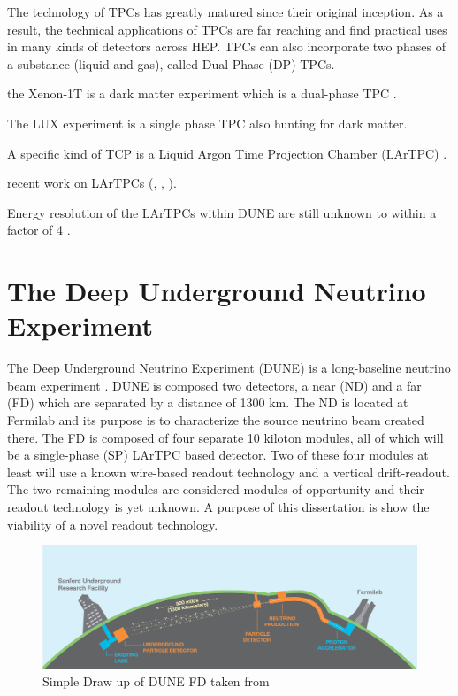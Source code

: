 The technology of TPCs has greatly matured since their original inception. 
As a result, the technical applications of TPCs are far reaching and find practical uses
in many kinds of detectors across HEP. TPCs can also incorporate two phases of a substance (liquid and gas), called Dual Phase (DP) TPCs.

the Xenon-1T is a dark matter experiment which is a dual-phase TPC \citep{Aprile_2017_xenon1T}.

The LUX experiment is a single phase TPC also hunting for dark matter.


A specific kind of TCP is a Liquid Argon Time Projection Chamber (LArTPC) \citep{rubbia1977liquid}.

recent work on LArTPCs (\citep{ArgoNeuT:PhysRevD.99.012002}, \citep{MicroBooNE:Acciarri_2017}, \citep{LArIAT:Acciarri_2020}).


Energy resolution of the LArTPCs within DUNE are still unknown to within a factor of 4 \citep{lartpc_energy_resolution:PhysRevD.99.036009}.


\section{The Deep Underground Neutrino Experiment}

The Deep Underground Neutrino Experiment (DUNE) is a long-baseline neutrino beam experiment \cite{DUNE_TDR_V1_Abi_2020, DUNE_FD_TDRv2_2020, DUNE_TDRv3_Abi_2020, DUNE-FD_TDRv4:Abi_2020}. 
DUNE is composed two detectors, a near (ND) and a far (FD) which are separated by a distance of 1300 km. 
The ND is located at Fermilab and its purpose is to characterize the source neutrino beam created there.
The FD is composed of four separate 10 kiloton modules, all of which will be a single-phase (SP) LArTPC based detector.
Two of these four modules at least will use a known wire-based readout technology and a vertical drift-readout.
The two remaining modules are considered modules of opportunity and their readout technology is yet unknown.
A purpose of this dissertation is show the viability of a novel readout technology.

\begin{figure}[ht!]
\centering
\includegraphics[width=\textwidth]{images/LBNE_Graphic_061615_2016.jpg}
\caption{Simple Draw up of DUNE FD taken from \citep{dune_cdr_2016_arxiv}}
\end{figure}

